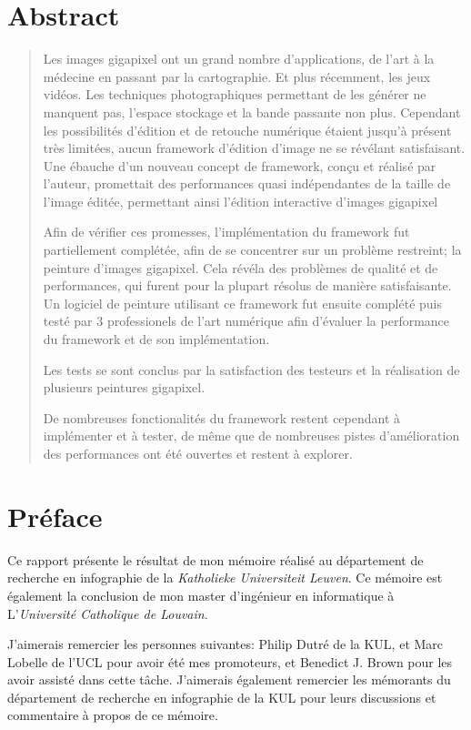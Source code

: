 
\chapter*{Abstract}
	\begin{abstract}
	Les images gigapixel ont un grand nombre d'applications, de l'art à la médecine en passant par la cartographie. Et plus 
	récemment, les jeux vidéos. Les techniques photographiques permettant de les générer ne manquent pas, l'espace stockage 
	et la bande passante non plus. Cependant les possibilités d'édition et de retouche numérique étaient jusqu'à présent 
	très limitées, aucun framework d'édition d'image ne se révélant satisfaisant. Une ébauche d'un nouveau concept de framework,
	conçu et réalisé par l'auteur, promettait des performances quasi indépendantes de la taille de l'image éditée, permettant ainsi 
	l'édition interactive d'images gigapixel

	Afin de vérifier ces promesses, l'implémentation du framework fut partiellement complétée, afin de se concentrer sur un problème restreint;
	la peinture d'images gigapixel. Cela révéla des problèmes de qualité et de performances,
	qui furent pour la plupart résolus de manière satisfaisante. Un logiciel de peinture utilisant ce framework fut ensuite 
	complété puis testé par 3 professionels de l'art numérique afin d'évaluer la performance du framework et de son implémentation. 

	Les tests se sont conclus par la satisfaction des testeurs et la réalisation de plusieurs peintures gigapixel. 

	De nombreuses fonctionalités du framework restent cependant à implémenter et à tester, de même que de nombreuses pistes
	d'amélioration des performances ont été ouvertes et restent à explorer.
	\end{abstract}
	

\chapter*{Préface}
	Ce rapport présente le résultat de mon mémoire réalisé au département de recherche en infographie de la \emph{Katholieke Universiteit Leuven}.
	Ce mémoire est également la conclusion de mon master d'ingénieur en informatique à L'\emph{Université Catholique de Louvain}.

	J'aimerais remercier les personnes suivantes: Philip Dutré de la KUL, et Marc Lobelle de l'UCL pour avoir été mes promoteurs,
	et Benedict J. Brown pour les avoir assisté dans cette tâche. J'aimerais également remercier les mémorants du département de recherche en infographie
	de la KUL pour leurs discussions et commentaire à propos de ce mémoire. 

